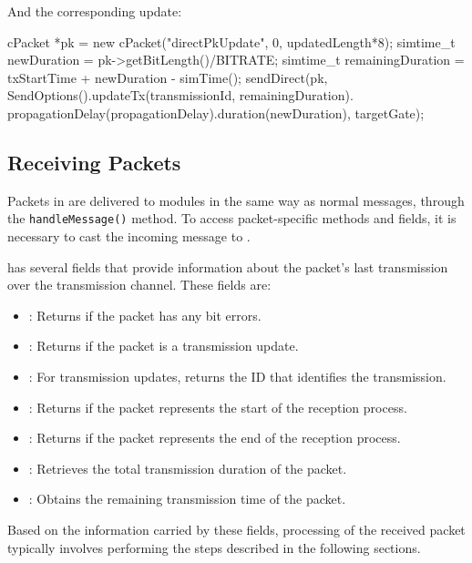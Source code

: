 And the corresponding update:

\begin{cpp}
cPacket *pk = new cPacket("directPkUpdate", 0, updatedLength*8);
simtime_t newDuration = pk->getBitLength()/BITRATE;
simtime_t remainingDuration = txStartTime + newDuration - simTime();
sendDirect(pk,
    SendOptions().updateTx(transmissionId, remainingDuration).
                  propagationDelay(propagationDelay).duration(newDuration),
    targetGate);
\end{cpp}


\subsection{Receiving Packets}
\label{sec:simple-modules:receiving-a-packet}

Packets in {\omnetpp} are delivered to modules in the same way as normal messages,
through the \texttt{handleMessage()} method. To access packet-specific methods
and fields, it is necessary to cast the incoming message to .

 has several fields that provide information about the packet's
last transmission over the transmission channel. These fields are:

\begin{itemize}
  \item {}: Returns  if the packet has any bit errors.
  \item {}: Returns  if the packet is a transmission update.
  \item {}: For transmission updates, returns the ID that identifies the transmission.
  \item {}: Returns  if the packet represents the start of the reception process.
  \item {}: Returns  if the packet represents the end of the reception process.
  \item {}: Retrieves the total transmission duration of the packet.
  \item {}: Obtains the remaining transmission time of the packet.
\end{itemize}

Based on the information carried by these fields, processing of the received
packet typically involves performing the steps described in the following sections.



